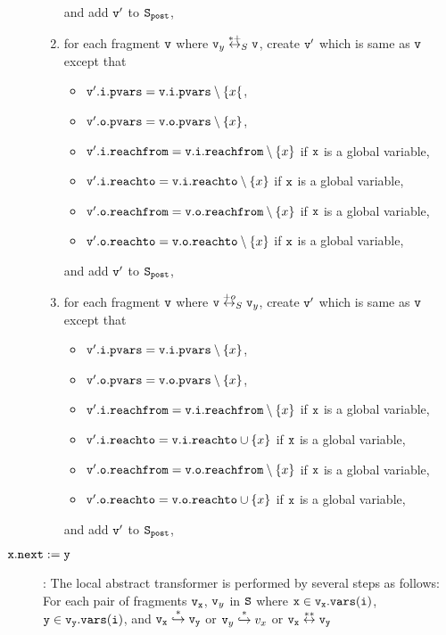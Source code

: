 \begin{description}
\begin{enumerate}
\begin{itemize}
\end{itemize}
and add $\mathtt{v}'$ to $\tt S_{post}$,
\item for each fragment $\mathtt{v}$ where $\mathtt{v}_y \overset{*+}\leftrightarrow_S \mathtt{v}$, create $\mathtt{v}'$ which is same as $\mathtt{v}$ except that 
\begin{itemize}
\item $\mathtt{v}'.\mathtt{i}.\mathtt{pvars} = \mathtt{v}.\mathtt{i}.\mathtt{pvars} \setminus \{x\{$,
\item $\mathtt{v}'.\mathtt{o}.\mathtt{pvars} = \mathtt{v}.\mathtt{o}.\mathtt{pvars} \setminus \left\{x\right\}$,
\item $\mathtt{v}'.\mathtt{i}.\mathtt{reachfrom} = \mathtt{v}.\mathtt{i}.\mathtt{reachfrom} \setminus \left\{x\right\}$ if $\tt x$ is a global variable,
\item $\mathtt{v}'.\mathtt{i}.\mathtt{reachto} = \mathtt{v}.\mathtt{i}.\mathtt{reachto} \setminus \left\{x\right\}$ if $\tt x$ is a global variable,
\item $\mathtt{v}'.\mathtt{o}.\mathtt{reachfrom} = \mathtt{v}.\mathtt{o}.\mathtt{reachfrom} \setminus \left\{x\right\}$ if $\tt x$ is a global variable,
\item $\mathtt{v}'.\mathtt{o}.\mathtt{reachto} = \mathtt{v}.\mathtt{o}.\mathtt{reachto} \setminus \left\{x\right\}$ if $\tt x$ is a global variable,
\end{itemize}
and add $\mathtt{v}'$ to $\tt S_{post}$,
\item for each fragment $\mathtt{v}$ where $\mathtt{v} \overset{+o}\leftrightarrow_S \mathtt{v}_y$, create $\mathtt{v}'$ which is same as $\mathtt{v}$ except that 
\begin{itemize}
\item $\mathtt{v}'.\mathtt{i}.\mathtt{pvars} = \mathtt{v}.\mathtt{i}.\mathtt{pvars} \setminus \left\{x\right\}$,
\item $\mathtt{v}'.\mathtt{o}.\mathtt{pvars} = \mathtt{v}.\mathtt{o}.\mathtt{pvars} \setminus \left\{x\right\}$,
\item $\mathtt{v}'.\mathtt{i}.\mathtt{reachfrom} = \mathtt{v}.\mathtt{i}.\mathtt{reachfrom} \setminus \left\{x\right\}$ if $\tt x$ is a global variable,
\item $\mathtt{v}'.\mathtt{i}.\mathtt{reachto} = \mathtt{v}.\mathtt{i}.\mathtt{reachto} \cup \left\{x\right\}$ if $\tt x$ is a global variable,
 \item $\mathtt{v}'.\mathtt{o}.\mathtt{reachfrom} = \mathtt{v}.\mathtt{o}.\mathtt{reachfrom} \setminus \left\{x\right\}$ if $\tt x$ is a global variable,
 \item $\mathtt{v}'.\mathtt{o}.\mathtt{reachto} = \mathtt{v}.\mathtt{o}.\mathtt{reachto} \cup \left\{x\right\}$ if $\tt x$ is a global variable,
\end{itemize}
and add $\mathtt{v}'$ to $\tt S_{post}$,
\end{enumerate}	
\item[${\tt x.next:= y}$]:
  The local abstract transformer is performed by several steps as follows: For each pair of fragments $\tt v_x$, $\mathtt{v}_y$ in $\tt S$ where $\tt x \in v_x.{\tt vars}(\tt i)$, $\tt y \in \mathtt{v}_y.{\tt vars}(\tt i)$, and $\tt v_x \overset{*}\hookrightarrow \mathtt{v}_y$ or $\mathtt{v}_y \overset{*}\hookrightarrow v_x$ or $\tt v_x \overset{**}\leftrightarrow \mathtt{v}_y$

\end{description}
